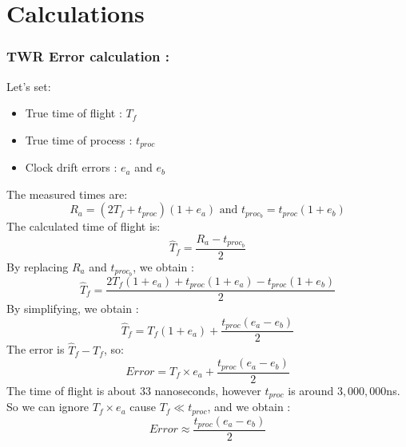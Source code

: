 \chapter*{Calculations}
\subsection*{TWR Error calculation : } \label{TWR-Error-calculation}
Let's set: 
\begin{itemize}
\item True time of flight : $T_{f}$
\item True time of process : $t_{proc}$
\item Clock drift errors : $e_a$ and $e_b$
\end{itemize}
The measured times are: 
\begin{equation*}
R_a = (2T_f + t_{proc})(1 + e_a) \text{ and } t_{proc_b} = t_{proc}(1 + e_b)
\end{equation*}
The calculated time of flight is:
\begin{equation*}
\hat{T}_f = \frac{R_a -t_{proc_b}}{2}
\end{equation*}
By replacing $R_a$ and $t_{proc_b}$, we obtain : 
\begin{equation*}
\hat{T}_f = \frac{2T_f(1 + e_a) + t_{proc}(1 + e_a) - t_{proc}(1 + e_b)}{2}
\end{equation*}
By simplifying, we obtain :
\begin{equation*}
\hat{T}_f = T_f(1 + e_a) + \frac{t_{proc}(e_a - e_b)}{2}
\end{equation*}
The error is $\hat{T}_f - T_f$, so: \\
\begin{equation*}
Error = T_f \times e_a + \frac{t_{proc}(e_a - e_b)}{2}
\end{equation*}
The time of flight is about 33 nanoseconds, however $t_{proc}$ is around $3,000,000$ns. \\
So we can ignore $T_f \times e_a$ cause $T_{f} \ll t_{proc}$, and we obtain :
\begin{equation}
Error \approx \frac{t_{proc}(e_a - e_b)}{2} \label{error_TWR}
\end{equation}

